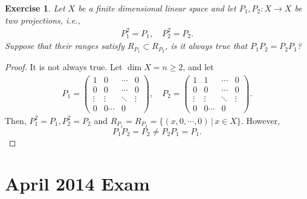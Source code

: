 \documentclass[11pt]{article}
\newtheorem{exercise}{Exercise}[section]
\theoremstyle{definition}
\numberwithin{equation}{subsection}
\begin{document}
\medskip

\begin{exercise}{\rm *}
Let $X$ be a finite dimensional linear space and let $P_1, P_2: X \to X$ be two projections, i.e.,
\begin{align*}
    P_1^2 = P_1, \quad P_2^2 = P_2.
\end{align*}
Suppose that their ranges satisfy $R_{P_1} \subset R_{P_2}$, is it always true that $P_1P_2 = P_2P_1$?
\end{exercise}
\begin{proof}
It is not always true. Let $\dim X = n \geq 2$, and let 
\begin{align*}
    P_1 = \begin{pmatrix}
        1 & 0 & \cdots & 0 \\
        0 & 0 & \cdots & 0 \\
        \vdots & \vdots & \ddots & \vdots \\
        0 & 0 \cdots & 0
    \end{pmatrix},\quad P_2 = \begin{pmatrix}
        1 & 1 & \cdots & 0 \\
        0 & 0 & \cdots & 0 \\
        \vdots & \vdots & \ddots & \vdots \\
        0 & 0 \cdots & 0 
    \end{pmatrix}.
\end{align*}
Then, $P_1^2 = P_1, P_2^2 = P_2$ and $R_{P_1} = R_{P_2} = \{(x, 0, \cdots, 0)\, | \, x \in X\}$. However, $$P_1P_2 = P_2 \neq P_2P_1 = P_1.$$
\end{proof}


\newpage
\section{April 2014 Exam}
\end{document}
